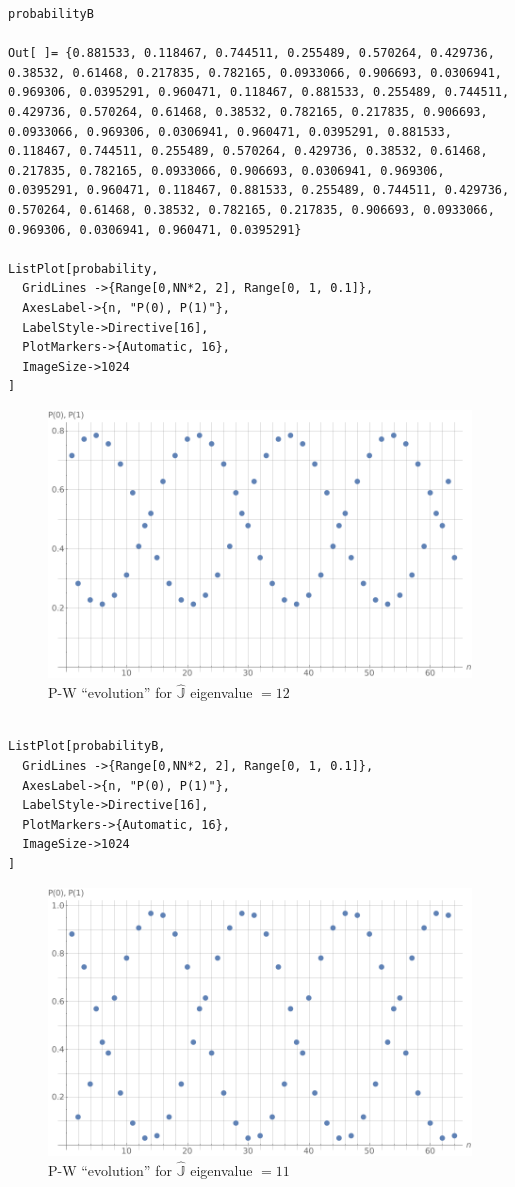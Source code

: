 \begin{Verbatim}
probabilityB

Out[ ]= {0.881533, 0.118467, 0.744511, 0.255489, 0.570264, 0.429736, 0.38532, 0.61468, 0.217835, 0.782165, 0.0933066, 0.906693, 0.0306941, 0.969306, 0.0395291, 0.960471, 0.118467, 0.881533, 0.255489, 0.744511, 0.429736, 0.570264, 0.61468, 0.38532, 0.782165, 0.217835, 0.906693, 0.0933066, 0.969306, 0.0306941, 0.960471, 0.0395291, 0.881533, 0.118467, 0.744511, 0.255489, 0.570264, 0.429736, 0.38532, 0.61468, 0.217835, 0.782165, 0.0933066, 0.906693, 0.0306941, 0.969306, 0.0395291, 0.960471, 0.118467, 0.881533, 0.255489, 0.744511, 0.429736, 0.570264, 0.61468, 0.38532, 0.782165, 0.217835, 0.906693, 0.0933066, 0.969306, 0.0306941, 0.960471, 0.0395291}

ListPlot[probability,
  GridLines ->{Range[0,NN*2, 2], Range[0, 1, 0.1]},
  AxesLabel->{n, "P(0), P(1)"},
  LabelStyle->Directive[16],
  PlotMarkers->{Automatic, 16},
  ImageSize->1024
]
\end{Verbatim}
\begin{figure}[!h]
  \centering
  \includegraphics[width=.75\textwidth]{img/N32.png}
  \caption[(from notebook)]{P-W ``evolution'' for $\hat{\mathbb{J}}$ eigenvalue $=12$}
\end{figure}  
\begin{Verbatim}

ListPlot[probabilityB,
  GridLines ->{Range[0,NN*2, 2], Range[0, 1, 0.1]},
  AxesLabel->{n, "P(0), P(1)"},
  LabelStyle->Directive[16],
  PlotMarkers->{Automatic, 16},
  ImageSize->1024
]
\end{Verbatim}
\begin{figure}[!h]
  \centering
  \includegraphics[width=.75\textwidth]{img/N32-B.png}
  \caption[(from notebook)]{P-W ``evolution'' for $\hat{\mathbb{J}}$ eigenvalue $=11$}
\end{figure}

